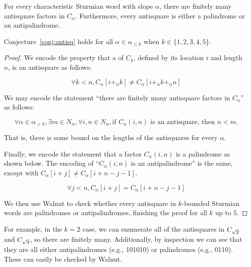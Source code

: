 \begin{conjecture}\label{conj:antisq}
    For every characteristic Sturmian word with slope $\alpha$, there are finitely many antisquare factors in $C_{\alpha}$.
    Furthermore, every antisquare is either a palindrome or an antipalindrome.
\end{conjecture}

\begin{theorem}\label{thm:antisq}
Conjecture~\ref{conj:antisq} holds for all $\alpha \in \alpha_{\leq k}$ when $k \in \{1,2,3,4,5\}$.
\end{theorem}
\begin{proof}
We encode the property that a \factor of $C_k$, defined by its location $i$ and length $n$, is an antisquare as follows:

\begin{equation*}\label{def:antisq}
\forall k < n, C_{\alpha}[i +_{\alpha} k] \neq C_{\alpha}[i +_{\alpha} k +_{\alpha} n]
\end{equation*}

We may encode the statement ``there are finitely many antisquare factors in $C_{\alpha}$'' as follows:

\begin{equation*}\label{def:antisq-conj}
\forall \alpha \in \alpha_{<k}, \exists m \in N_{\alpha}, \forall i, n \in N_{\alpha}, \text{if $C_{\alpha}(i,n)$ is an antisquare, then $n < m$}.
\end{equation*}

That is, there is some bound on the lengths of the antisquares for every $\alpha$.

Finally, we encode the statement that a factor $C_{\alpha}(i,n)$ is a palindrome as shown below.
The encoding of ``$C_{\alpha}(i,n)$ is an antipalindrome'' is the same, except with $C_{\alpha}[i+j] \neq C_{\alpha}[i+n-j-1]$.

\begin{equation*}\label{def:palindrome}
    \forall j < n, C_{\alpha}[i + j] = C_{\alpha}[i + n - j - 1]
\end{equation*}

We then use Walnut to check whether every antisquare in $k$-bounded Sturmian words are palindromes or antipalindromes, finishing the proof for all $k$ up to $5$.
\end{proof}

For example, in the $k = 2$ case, we can enumerate all of the antisquares in $C_{\sqrt{2}}$ and $C_{\sqrt{3}}$, so there are finitely many.
Additionally, by inspection we can see that they are all either antipalindromes (e.g., 101010) or palindromes (e.g., 0110).
These can easily be checked by Walnut.


